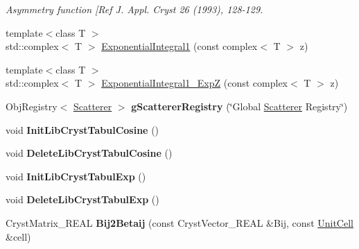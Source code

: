\begin{DoxyCompactItemize}
\begin{DoxyCompactList}\small\item\em Asymmetry function \mbox{[}Ref J. Appl. Cryst 26 (1993), 128-\/129. \end{DoxyCompactList}\item 
{\footnotesize template$<$class T $>$ }\\std\+::complex$<$ T $>$ \mbox{\hyperlink{namespace_obj_cryst_abc463ee467fb2171653c5967dbb41c30}{Exponential\+Integral1}} (const complex$<$ T $>$ z)
\item 
{\footnotesize template$<$class T $>$ }\\std\+::complex$<$ T $>$ \mbox{\hyperlink{namespace_obj_cryst_a74bf8a13319fe6f59d1bcd6da225a175}{Exponential\+Integral1\+\_\+\+ExpZ}} (const complex$<$ T $>$ z)
\item 
\mbox{\label{namespace_obj_cryst_a9925f1ab82c64d0595cc45a2eed70893}} 
Obj\+Registry$<$ \mbox{\hyperlink{class_obj_cryst_1_1_scatterer}{Scatterer}} $>$ {\bfseries g\+Scatterer\+Registry} (\char`\"{}Global \mbox{\hyperlink{class_obj_cryst_1_1_scatterer}{Scatterer}} Registry\char`\"{})
\item 
\mbox{\label{namespace_obj_cryst_ab36e933d4f424fa228972eadb98f2491}} 
void {\bfseries Init\+Lib\+Cryst\+Tabul\+Cosine} ()
\item 
\mbox{\label{namespace_obj_cryst_a493b2bc1841b1ccccec63bf416bae9e9}} 
void {\bfseries Delete\+Lib\+Cryst\+Tabul\+Cosine} ()
\item 
\mbox{\label{namespace_obj_cryst_ae850cb956265bbb049c68c6a59717b66}} 
void {\bfseries Init\+Lib\+Cryst\+Tabul\+Exp} ()
\item 
\mbox{\label{namespace_obj_cryst_a31a50fbd13f45db32d73dc1170d2abc3}} 
void {\bfseries Delete\+Lib\+Cryst\+Tabul\+Exp} ()
\item 
\mbox{\label{namespace_obj_cryst_aa3a8ec54a5ff6a6029df16ab4fb1500e}} 
Cryst\+Matrix\+\_\+\+R\+E\+AL {\bfseries Bij2\+Betaij} (const Cryst\+Vector\+\_\+\+R\+E\+AL \&Bij, const \mbox{\hyperlink{class_obj_cryst_1_1_unit_cell}{Unit\+Cell}} \&cell)
\item 
\mbox{\label{namespace_obj_cryst_adbc8989175ea95b2bcef0d40d957be21}} 

\end{DoxyCompactItemize}
